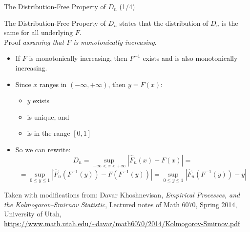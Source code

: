 \documentclass{beamer}
\begin{document}
\begin{frame}
{\centerline{The Distribution-Free Property of $D_n$ (1/4)}}

The Distribution-Free Property of $D_n$ states that the distribution of  $D_n$ is the same for all underlying $F$.\\
Proof \textit{assuming that $F$ is monotonically increasing}.
\begin{itemize}
\item If $F$ is monotonically increasing, then $F^{-1}$ exists and is also monotonically increasing.
\item Since $x$ ranges in $(-\infty,+\infty)$, then $y = F(x)$:
\begin{itemize}
\item $y$ exists
\item is unique, and
\item is in the range $[0,1]$
\end{itemize}
\item So we can rewrite:
$$D_{n}=\sup _{-\infty < x < +\infty}|\widehat {F}_{n}(x)-F(x)| = $$
$$ = \sup _{0 \leq y \leq 1}|\widehat {F}_{n}(F^{-1}(y))-F(F^{-1}(y))| = \sup _{0 \leq y \leq 1}|\widehat {F}_{n}(F^{-1}(y))-y| $$

\end{itemize}



\begin{center}
\tiny{Taken with modifications from: Davar Khoshnevisan, \textit{Empirical Processes, and the Kolmogorov–Smirnov Statistic}, Lectured notes of Math 6070, Spring 2014, University of Utah, \url{https://www.math.utah.edu/~davar/math6070/2014/Kolmogorov-Smirnov.pdf}}
\end{center}

\end{frame}
\end{document}
